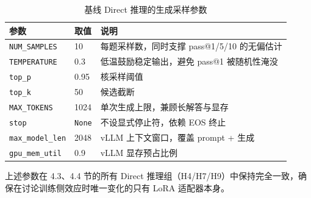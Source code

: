 \begin{table}[!htb]
  \centering
  \caption{基线 Direct 推理的生成采样参数}
  \label{tab:ch4-base-sampling}
  \footnotesize
  \begin{tabular}{llp{6.8cm}}
    \toprule
    参数 & 取值 & 说明 \\
    \midrule
    \texttt{NUM\_SAMPLES}  & 10   & 每题采样数，同时支撑 pass@1/5/10 的无偏估计 \\
    \texttt{TEMPERATURE}   & 0.3  & 低温鼓励稳定输出，避免 pass@1 被随机性淹没 \\
    \texttt{top\_p}        & 0.95 & 核采样阈值 \\
    \texttt{top\_k}        & 50   & 候选截断 \\
    \texttt{MAX\_TOKENS}   & 1024 & 单次生成上限，兼顾长解答与显存 \\
    \texttt{stop}          & \texttt{None} & 不设显式停止符，依赖 EOS 终止 \\
    \texttt{max\_model\_len} & 2048 & vLLM 上下文窗口，覆盖 prompt + 生成 \\
    \texttt{gpu\_mem\_util}  & 0.9  & vLLM 显存预占比例 \\
    \bottomrule
  \end{tabular}
\end{table}

上述参数在 4.3、4.4 节的所有 Direct 推理组（H4/H7/H9）中保持完全一致，确保在讨论训练侧效应时唯一变化的只有 LoRA 适配器本身。
